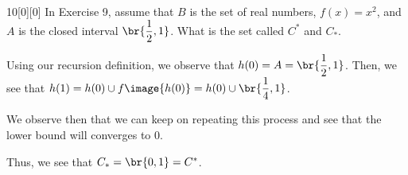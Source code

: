 \documentclass{article}
\begin{document}
\begin{hw}{10}[0][0]
	In Exercise 9, assume that $B$ is the set of real numbers, $f(x) = x^{2}$, and $A$ is the closed interval $\br{\dfrac{1}{2}, 1}$. What is the set called $C^{*}$ and $C_{*}$.
\end{hw}
\begin{solution}
	Using our recursion definition, we observe that $h(0) = A = \br{\dfrac{1}{2}, 1}$. Then, we see that $h(1) = h(0) \cup f\image{h(0)} = h(0) \cup \br{\dfrac{1}{4}, 1}$.
	
	We observe then that we can keep on repeating this process and see that the lower bound will converges to 0.
	
	Thus, we see that $C_{*} = \br{0,1} = C^{*}$.
\end{solution}
\end{document}
